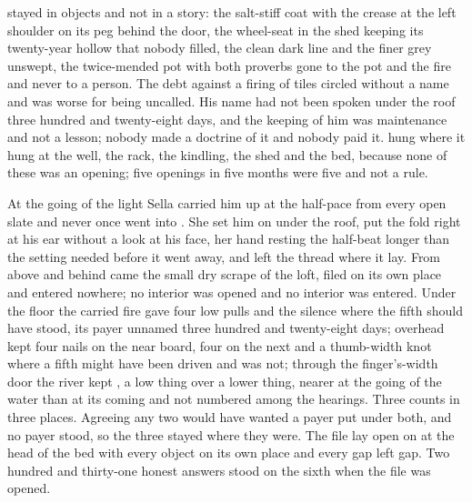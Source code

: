  stayed in objects and not in a story: the salt-stiff coat with the crease at the left shoulder on its peg behind the door, the wheel-seat in the shed keeping its twenty-year hollow that nobody filled, the clean dark line and the finer grey unswept, the twice-mended pot with both proverbs gone to the pot and the fire and never to a person. The debt against a firing of tiles circled without a name and was worse for being uncalled. His name had not been spoken under the roof three hundred and twenty-eight days, and the keeping of him was maintenance and not a lesson; nobody made a doctrine of it and nobody paid it.  hung where it hung at the well, the rack, the kindling, the shed and the bed, because none of these was an opening; five openings in five months were five and not a rule.

At the going of the light Sella carried him up at the half-pace from every open slate and never once went into . She set him on  under the roof, put the fold right at his ear without a look at his face, her hand resting the half-beat longer than the setting needed before it went away, and left the thread where it lay. From above and behind came the small dry scrape of the loft, filed on its own place and entered nowhere; no interior was opened and no interior was entered. Under the floor the carried fire gave four low pulls and the silence where the fifth should have stood, its payer unnamed three hundred and twenty-eight days; overhead  kept four nails on the near board, four on the next and a thumb-width knot where a fifth might have been driven and was not; through the finger's-width door the river kept , a low thing over a lower thing, nearer at the going of the water than at its coming and not numbered among the hearings. Three counts in three places. Agreeing any two would have wanted a payer put under both, and no payer stood, so the three stayed where they were. The file lay open on  at the head of the bed with every object on its own place and every gap left gap. Two hundred and thirty-one honest answers stood on the sixth when the file was opened.

